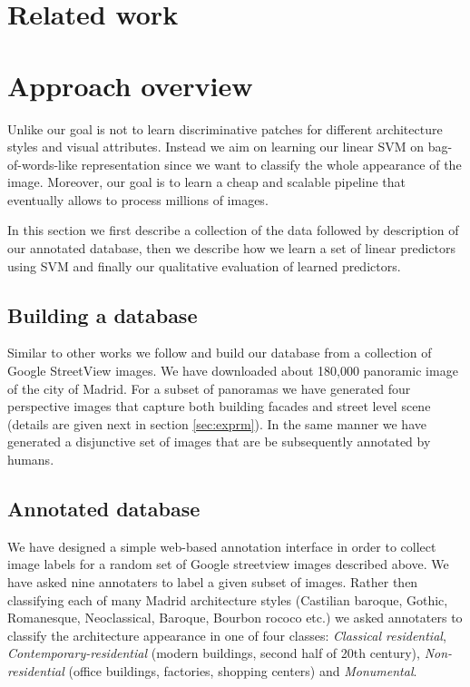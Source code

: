\documentclass[runningheads, table]{llncs}
\begin{document}
\section{Related work}

\section{Approach overview}
Unlike \cite{Doersch} our goal is not to learn discriminative patches for different architecture styles and visual attributes. Instead we aim on learning our linear SVM on bag-of-words-like representation since we want to classify the whole appearance of the image. Moreover, our goal is to learn a cheap and scalable pipeline that eventually allows to process millions of images.

In this section we first describe a collection of the data followed by description of our annotated database, then we describe how we learn a set of linear predictors using SVM and finally our qualitative evaluation of learned predictors.

\subsection{Building a database}
  \vspace{-1mm}
  Similar to other works \cite{Gronat13, Doersch} we follow \cite{Gronat11} and build our database from a collection of Google StreetView images. We have downloaded about 180,000 panoramic image of the city of Madrid. For a subset of panoramas we have generated four perspective images that capture both building facades and street level scene (details are given next in section \ref{sec:exprm}). In the same manner we have generated a disjunctive set of images that are be subsequently annotated by humans. 
  
\subsection{Annotated database} 
  \vspace{-1mm}
  We have designed a simple web-based annotation interface in order to collect image labels for a random set of Google streetview images described above. We have asked nine annotaters to label a given subset of images. Rather then  classifying each of many Madrid architecture styles (Castilian baroque, Gothic, Romanesque, Neoclassical, Baroque, Bourbon rococo etc.) we asked annotaters to classify the architecture appearance in one of four classes: \emph{Classical residential}, \emph{Contemporary-residential} (modern buildings, second half of 20th century), \emph{Non-residential} (office buildings, factories, shopping centers) and \emph{Monumental}. 
\end{document}
